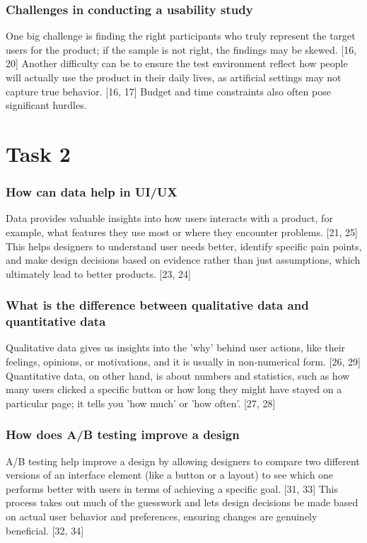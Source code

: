 \documentclass[12pt,a4paper]{article}
\begin{document}
\subsubsection*{Challenges in conducting a usability study}
One big challenge is finding the right participants who truly represent the target users for the product; if the sample is not right, the findings may be skewed. [16, 20] Another difficulty can be to ensure the test environment reflect how people will actually use the product in their daily lives, as artificial settings may not capture true behavior. [16, 17] Budget and time constraints also often pose significant hurdles.

\vspace{1cm}

\section*{Task 2}

\subsubsection*{How can data help in UI/UX}
Data provides valuable insights into how users interacts with a product, for example, what features they use most or where they encounter problems. [21, 25] This helps designers to understand user needs better, identify specific pain points, and make design decisions based on evidence rather than just assumptions, which ultimately lead to better products. [23, 24]

\subsubsection*{What is the difference between qualitative data and quantitative data}
Qualitative data gives us insights into the 'why' behind user actions, like their feelings, opinions, or motivations, and it is usually in non-numerical form. [26, 29] Quantitative data, on other hand, is about numbers and statistics, such as how many users clicked a specific button or how long they might have stayed on a particular page; it tells you 'how much' or 'how often'. [27, 28]

\subsubsection*{How does A/B testing improve a design}
A/B testing help improve a design by allowing designers to compare two different versions of an interface element (like a button or a layout) to see which one performs better with users in terms of achieving a specific goal. [31, 33] This process takes out much of the guesswork and lets design decisions be made based on actual user behavior and preferences, ensuring changes are genuinely beneficial. [32, 34]
\end{document}
